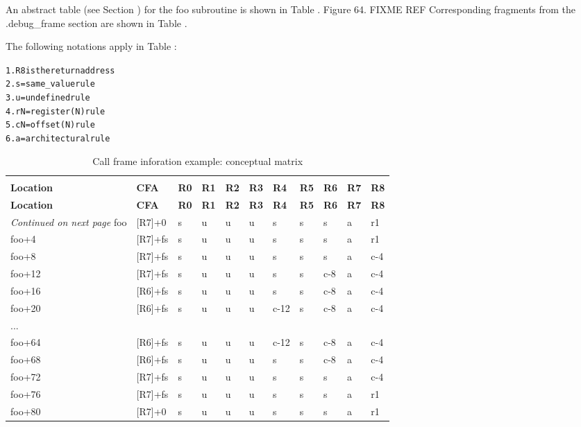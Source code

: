 An abstract table 
(see Section ) 
for the foo subroutine
is shown in 
Table .
Figure 64. FIXME REF 
Corresponding fragments from the
.debug\_frame section are shown in 
Table .

The following notations apply in 
Table :

\begin{alltt}
1. R8 is the return address
2. s = same\_value rule
3. u = undefined rule
4. rN = register(N) rule
5. cN = offset(N) rule
6. a = architectural rule
\end{alltt}

\begin{centering}
\setlength{\extrarowheight}{0.1cm}
\begin{longtable}{lllllllllll}
  \caption{Call frame inforation example: conceptual matrix} \label{tab:callframeinformationexampleconceptualmatrix} \\
  \hline \\ \bfseries Location & \bfseries CFA & \bfseries R0 & \bfseries R1 & \bfseries R2 & \bfseries R3 & \bfseries R4 & \bfseries R5 & \bfseries R6 & \bfseries R7 & \bfseries R8 \\ \hline
\endfirsthead
  \bfseries Location &\bfseries CFA &\bfseries R0 & \bfseries R1 & \bfseries R2 &\bfseries R3 &\bfseries R4 &\bfseries R5 &\bfseries R6 &\bfseries R7 &\bfseries R8\\ \hline
\endhead
  \hline \emph{Continued on next page}
\endfoot
  \hline
\endlastfoot
foo&[R7]+0&s&u&u&u&s&s&s&a&r1 \\
foo+4&[R7]+fs&s&u&u&u&s&s&s&a&r1 \\
foo+8&[R7]+fs&s&u&u&u&s&s&s&a&c-4 \\
foo+12&[R7]+fs&s&u&u&u&s&s&c-8&a&c-4 \\
foo+16&[R6]+fs&s&u&u&u&s&s&c-8&a&c-4 \\
foo+20&[R6]+fs&s&u&u&u&c-12&s&c-8&a&c-4 \\
...&&&&&&&&&& \\
foo+64&[R6]+fs&s&u&u&u&c-12&s&c-8&a&c-4 \\
foo+68&[R6]+fs&s&u&u&u&s&s&c-8&a&c-4  \\
foo+72&[R7]+fs&s&u&u&u&s&s&s&a&c-4  \\
foo+76&[R7]+fs&s&u&u&u&s&s&s&a&r1 \\
foo+80&[R7]+0&s&u&u&u&s&s&s&a&r1 \\
\end{longtable}
\end{centering}


